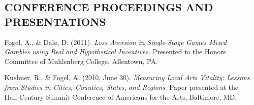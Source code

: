 \documentclass[margin, 10pt]{res} %
\begin{document}
\begin{resume}
\section{\small\bf CONFERENCE PROCEEDINGS AND \\ PRESENTATIONS}
Fogel, A., \& Dale, D. (2011). {\sl Loss Aversion in Single-Stage Games Mixed Gambles using Real and Hypothetical Incentives.} Presented to the Honors Committee of Muhlenberg College, Allentown, PA.

Kushner, R., \& Fogel, A. (2010, June 30). {\sl Measuring Local Arts Vitality: Lessons from Studies in Cities, Counties, States, and Regions}. Paper presented at the Half-Century Summit Conference of Americans for the Arts, Baltimore, MD.



\end{resume}
\end{document}
